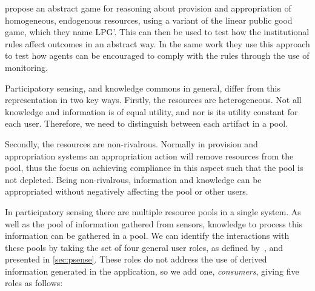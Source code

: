 \citet{Pitt2012c} propose an abstract game for reasoning about provision and
appropriation of homogeneous, endogenous resources, using a variant of the
linear public good game, which they name LPG'. This can then be used to test
how the institutional rules affect outcomes in an abstract way. In the same
work they use this approach to test how agents can be encouraged to comply
with the rules through the use of monitoring.

Participatory sensing, and knowledge commons in general, differ from this
representation in two key ways. Firstly, the resources are heterogeneous. Not
all knowledge and information is of equal utility, and nor is its utility
constant for each user. Therefore, we need to distinguish between each
artifact in a pool.

Secondly, the resources are non-rivalrous. Normally in provision and
appropriation systems an appropriation action will remove resources from the
pool, thus the focus on achieving compliance in this aspect such that the pool
is not depleted. Being non-rivalrous, information and knowledge can be
appropriated without negatively affecting the pool or other users.

In participatory sensing there are multiple resource pools in a single system.
As well as the pool of information gathered from sensors, knowledge to process
this information can be gathered in a pool. We can identify the interactions
with these pools by taking the set of four general user roles, as defined
by~, and presented in \autoref{sec:psense}. These roles
do not address the use of derived information generated in the application, so
we add one, \emph{consumers}, giving five roles as follows:

